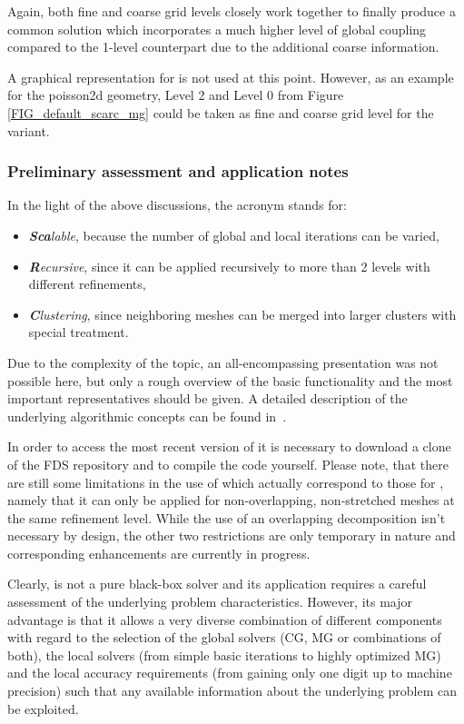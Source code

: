 {Again, both fine and coarse grid levels closely work together to finally produce a common solution which incorporates a much higher level of global coupling compared to the 1-level counterpart due to the additional coarse information.  

A graphical representation for \scarctwolevel{} is not used at this point. However, as an example for the {\ct poisson2d} geometry, Level 2 and Level 0 from Figure \ref{FIG_default_scarc_mg} could be taken as fine and coarse grid level for the \scarctwolevel{} variant.

\newpage
\subsubsection{Preliminary assessment and application notes}
In the light of the above discussions, the acronym \scarc{} stands for:
\begin{itemize}
\item {\it {\bf Sca}lable}, because the number of global and local iterations can be varied,
\item {\it {\bf R}ecursive}, since it can be applied recursively to more than 2 levels with different refinements,
\item {\it {\bf C}lustering}, since neighboring meshes can be merged into larger clusters with special treatment.
\end{itemize}
Due to the complexity of the topic, an all-encompassing presentation was not possible here, but only a rough overview of the basic functionality and the most important representatives should be given. 
A detailed description of the underlying algorithmic concepts can be found in~\cite{Kilian:2001, Kilian:1998, Goeddeke:2010, Wobker:2010}.

In order to access the most recent version of \scarc{} it is necessary to download a clone of the FDS repository and to compile the code yourself. Please note, that there are still some limitations in the use of \scarc{} which actually correspond to those for  \uglmat{}, namely that it can only be applied for non-overlapping, non-stretched meshes at the same refinement level. 
%
While the use of an overlapping decomposition isn't necessary by design, the other two restrictions are only temporary in nature and corresponding enhancements are currently in progress. 

Clearly, \scarc{} is not a pure black-box solver and its application requires a careful assessment of the underlying problem characteristics. However, its major advantage is that it allows a very diverse combination of different components with regard to the selection of the global solvers (CG, MG or combinations of both), the local solvers (from simple basic iterations to highly optimized MG) and the local accuracy requirements (from gaining only one digit up to machine precision) such that any available information about the underlying problem can be exploited.

}

